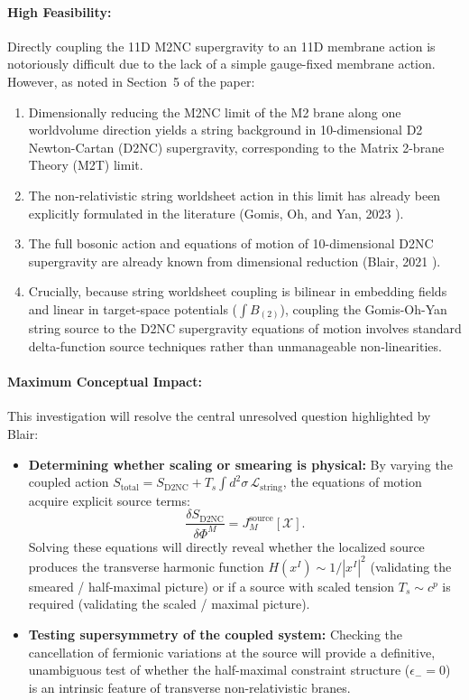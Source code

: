 \documentclass[11pt,a4paper]{article}
\begin{document}
\paragraph{High Feasibility:}
Directly coupling the 11D M2NC supergravity to an 11D membrane action is notoriously difficult due to the lack of a simple gauge-fixed membrane action. However, as noted in Section~5 of the paper:
\begin{enumerate}
    \item Dimensionally reducing the M2NC limit of the M2 brane along one worldvolume direction yields a string background in 10-dimensional D2 Newton-Cartan (D2NC) supergravity, corresponding to the Matrix 2-brane Theory (M2T) limit.
    \item The non-relativistic string worldsheet action in this limit has already been explicitly formulated in the literature (Gomis, Oh, and Yan, 2023 \cite{Gomis:2023eav}).
    \item The full bosonic action and equations of motion of 10-dimensional D2NC supergravity are already known from dimensional reduction (Blair, 2021 \cite{Blair:2021waq}).
    \item Crucially, because string worldsheet coupling is bilinear in embedding fields and linear in target-space potentials ($\int B_{(2)}$), coupling the Gomis-Oh-Yan string source to the D2NC supergravity equations of motion involves standard delta-function source techniques rather than unmanageable non-linearities.
\end{enumerate}

\paragraph{Maximum Conceptual Impact:}
This investigation will resolve the central unresolved question highlighted by Blair:
\begin{itemize}
    \item \textbf{Determining whether scaling or smearing is physical:} By varying the coupled action $S_{\text{total}} = S_{\text{D2NC}} + T_s \int d^2\sigma \, \mathcal{L}_{\text{string}}$, the equations of motion acquire explicit source terms:
    \begin{equation}
        \frac{\delta S_{\text{D2NC}}}{\delta \Phi^M} = J_M^{\text{source}}[\mathcal{X}].
    \end{equation}
    Solving these equations will directly reveal whether the localized source produces the transverse harmonic function $H(x^I) \sim 1/|x^I|^2$ (validating the smeared / half-maximal picture) or if a source with scaled tension $T_s \sim c^p$ is required (validating the scaled / maximal picture).
    \item \textbf{Testing supersymmetry of the coupled system:} Checking the cancellation of fermionic variations at the source will provide a definitive, unambiguous test of whether the half-maximal constraint structure ($\epsilon_- = 0$) is an intrinsic feature of transverse non-relativistic branes.
\end{itemize}
\end{document}
